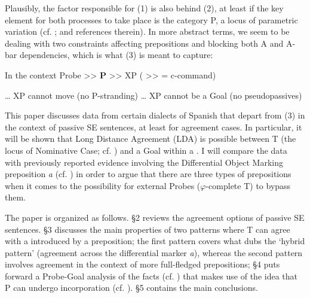 \documentclass[output=paper]{langsci/langscibook}
\begin{document}
    \z

Plausibly, the factor responsible for (1) is also behind (2), at least if the key element for both processes to take place is the category P, a locus of parametric variation (cf. \citealt{Hornstein1981,Kayne1984,Kayne1994,Kayne2005,Abels2003}; and references therein). In more abstract terms, we seem to be dealing with two constraints affecting prepositions and blocking both A and A-bar dependencies, which is what (3) is meant to capture:

\ea%
    \label{ex:gallego:3}
     In the context Probe >>  \textbf{P}  >>  XP  ( >> = c-command)\\
     \begin{xlisti}\setcounter{xnumii}{1}
     \ex \ldots\xspace XP cannot move (no P-stranding)
     \ex \ldots\xspace XP cannot be a Goal (no pseudopassives)
     \end{xlisti}
\z

This paper discusses data from certain dialects of Spanish that depart from (3) in the context of passive SE sentences, at least for agreement cases. In particular, it will be shown that Long Distance Agreement (LDA) is possible between T (the locus of Nominative Case; cf. \citealt{Chomsky2000,Chomsky2001Derivation}) and a \CATDP Goal within a \CATPP. I will compare the data with previously reported evidence involving the Differential Object Marking preposition \textit{a} (cf. \citealt{Torrego1998,López2012}) in order to argue that there are three types of prepositions when it comes to the possibility for external Probes ($\varphi $-complete T) to bypass them.

The paper is organized as follows. §2 reviews the agreement options of passive SE sentences. §3 discusses the main properties of two patterns where T can agree with a \CATDP introduced by a preposition; the first pattern covers what \citet{RAE-ASALE2009} dubs the ‘hybrid pattern’ (agreement across the differential marker \textit{a}), whereas the second pattern involves agreement in the context of more full-fledged prepositions; §4 puts forward a Probe-Goal analysis of the facts (cf. \citealt{Chomsky2000,Chomsky2001Derivation}) that makes use of the idea that P can undergo incorporation (cf. \citealt{Hornstein1981,Law2006}). §5 contains the main conclusions.
\end{document}
